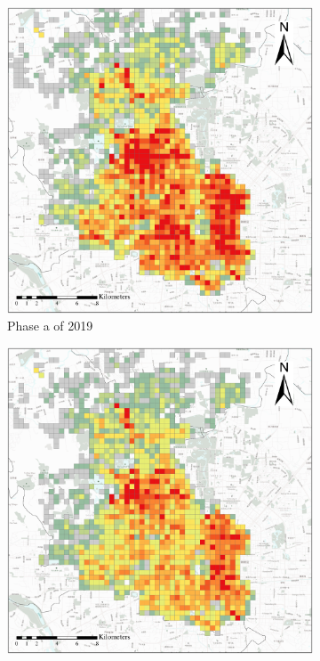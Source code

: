 \documentclass[preprints,ijgi,submit,moreauthors]{Definitions/mdpi}
\begin{document}
\begin{figure}[ht]
    \vspace{6pt}
    \begin{subfigure}{.3\textwidth}
        \includegraphics[width=\textwidth]{Figures/BSSPhase1_2019.eps}
        \caption{Phase a of 2019}
    \end{subfigure}
    \begin{subfigure}{.3\textwidth}
        \includegraphics[width=\textwidth]{Figures/BSSPhase2_2019.eps}

\end{subfigure}
\end{figure}
\end{document}
